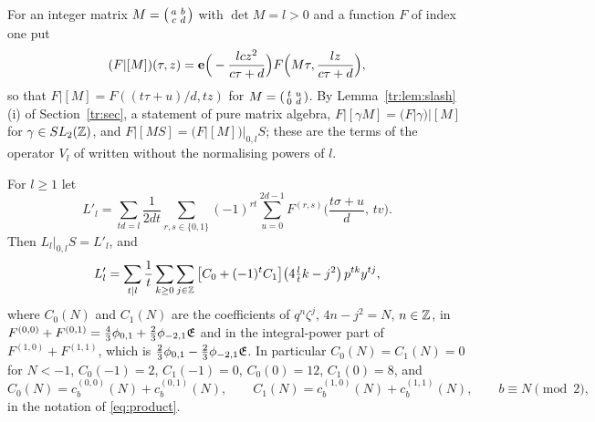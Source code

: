 For an integer matrix $M=\begin{psmallmatrix}a&b\\c&d\end{psmallmatrix}$ with $\det M=l>0$ and a function $F$ of index one put
\[
(F|[M])(\tau,z)=\mathbf e\Big(-\frac{lcz^2}{c\tau+d}\Big)F\Big(M\tau,\frac{lz}{c\tau+d}\Big),
\]
so that $F|[M]=F((t\tau+u)/d,tz)$ for $M=\begin{psmallmatrix}t&u\\0&d\end{psmallmatrix}$. By Lemma~\ref{tr:lem:slash}(i) of Section~\ref{tr:sec}, a statement of pure matrix algebra, $F|[\gamma M]=(F|\gamma)|[M]$ for $\gamma\in SL_2(\mathbb{Z})$, and $F|[MS]=(F|[M])|_{0,l}S$; these are the terms of the operator $V_l$ of \cite[\S4]{EZ85} written without the normalising powers of $l$.

\begin{lemma}\label{lem:LlS}
For $l\ge1$ let
\[
L'_l=\sum_{td=l}\frac1{2dt}\sum_{r,s\in\{0,1\}}(-1)^{rt}\sum_{u=0}^{2d-1}F^{(r,s)}\Big(\frac{t\sigma+u}d,\,tv\Big).
\]
Then $L_l|_{0,l}S=L'_l$, and
\[
L'_l=\sum_{t\mid l}\frac1t\sum_{k\ge0}\sum_{j\in\mathbb{Z}}\big[C_0+(-1)^tC_1\big]\big(4\tfrac ltk-j^2\big)\,p^{tk}y^{tj},
\]
where $C_0(N)$ and $C_1(N)$ are the coefficients of $q^n\zeta^j$, $4n-j^2=N$, $n\in\mathbb{Z}$, in $F^{(0,0)}+F^{(0,1)}=\frac43\phi_{0,1}+\frac23\phi_{-2,1}\mathfrak E$ and in the integral-power part of $F^{(1,0)}+F^{(1,1)}$, which is $\frac23\phi_{0,1}-\frac23\phi_{-2,1}\mathfrak E$. In particular $C_0(N)=C_1(N)=0$ for $N<-1$, $C_0(-1)=2$, $C_1(-1)=0$, $C_0(0)=12$, $C_1(0)=8$, and
\[
C_0(N)=c^{(0,0)}_b(N)+c^{(0,1)}_b(N),\qquad C_1(N)=c^{(1,0)}_b(N)+c^{(1,1)}_b(N),\qquad b\equiv N\pmod 2,
\]
in the notation of \eqref{eq:product}.
\end{lemma}

